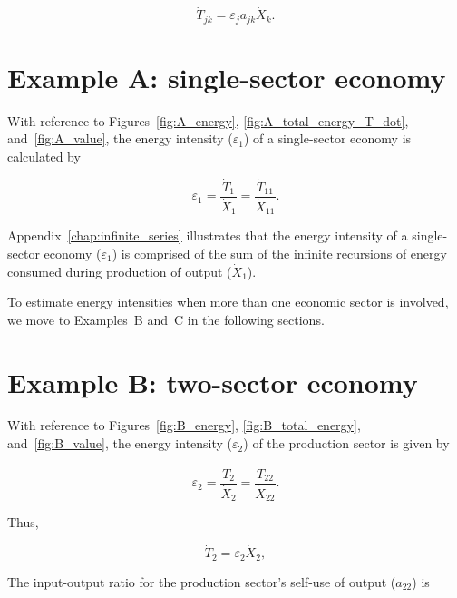 \begin{equation}
	\dot{T}_{jk} = \varepsilon_{j} a_{jk} \dot{X}_{k}.
\end{equation}


\section{Example A: single-sector economy} %

With reference to Figures~\ref{fig:A_energy}, 
\ref{fig:A_total_energy_T_dot}, 
and~\ref{fig:A_value},
the energy intensity ($\varepsilon_{1}$) of a single-sector economy is calculated by

\begin{equation} \label{eq:A-energy_intensity}
	\varepsilon_{1} 
	= \frac{\dot{T}_{1}}{\dot{X}_{1}} 
	= \frac{\dot{T}_{11}}{\dot{X}_{11}}.
\end{equation}

Appendix~\ref{chap:infinite_series} illustrates that the energy 
intensity of a single-sector economy ($\varepsilon_{1}$) 
is comprised of the sum of the infinite recursions
of energy consumed during production of output ($\dot{X}_{1}$).

To estimate energy intensities
when more than one economic sector is involved, 
we move to Examples~B and~C in the following sections.


\section{Example B: two-sector economy} %

With reference to Figures~\ref{fig:B_energy}, 
\ref{fig:B_total_energy},
and~\ref{fig:B_value}, 
the energy intensity ($\varepsilon_{2}$) 
of the production sector is given by

\begin{equation} \label{eq:single_sector_energy_intensity}
	\varepsilon_{2} 
	= \frac{\dot{T}_{2}}{\dot{X}_{2}} 
	= \frac{\dot{T}_{22}}{\dot{X}_{22}}.
\end{equation}

\noindent{}Thus,

\begin{equation} \label{eq:T_dot_1_single_sector}
	\dot{T}_{2} = \varepsilon_{2}\dot{X}_{2},
\end{equation}

The input-output ratio 
for the production sector's self-use of output ($a_{22}$) is

